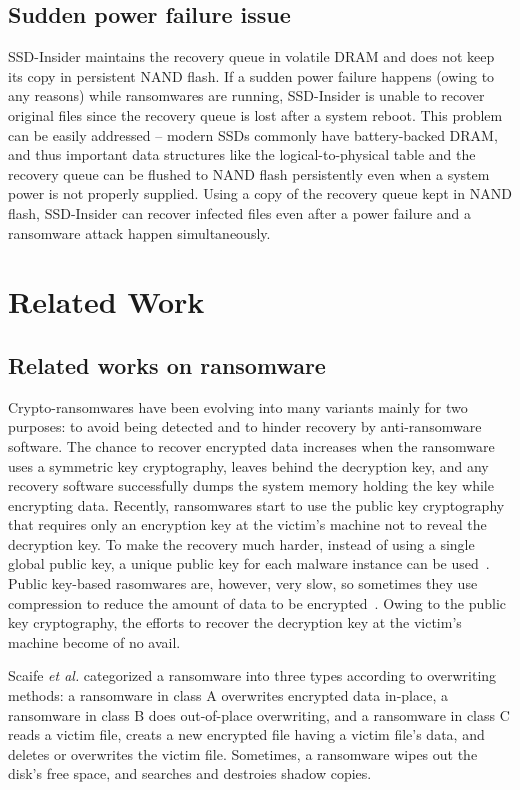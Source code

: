 \documentclass[conference]{IEEEtran}
\newcommand{\etal}{{\it et al.}\xspace}
\newcommand{\ours}{SSD-Insider}
\begin{document}
\subsection{Sudden power failure issue}
\ours{} maintains the recovery queue in volatile DRAM and does
not keep its copy in persistent NAND flash. If a sudden power
failure happens (owing to any reasons) while ransomwares are
running, \ours{} is unable to recover original files since the
recovery queue is lost after a system reboot.  This problem can be
easily addressed -- modern SSDs commonly have battery-backed DRAM,
and thus important data structures like the logical-to-physical
table and the recovery queue can be flushed to NAND flash
persistently even when a system power is not properly supplied.
Using a copy of the recovery queue kept in NAND flash, \ours{}
can recover infected files even after a power failure and a
ransomware attack happen simultaneously.



\section{Related Work}

\subsection{Related works on ransomware}\label{sec:rel-ran}

Crypto-ransomwares have been evolving into many variants mainly for two purposes: 
to avoid being detected and to hinder recovery by anti-ransomware software. 
The chance to recover encrypted data increases
when the ransomware uses a symmetric key cryptography, leaves behind the decryption key, 
and any recovery software successfully dumps the system memory holding the key 
while encrypting data. Recently, ransomwares start to use the public key cryptography 
that requires only an encryption key at the victim's machine not to reveal the decryption key.
To make the recovery much harder, instead of using a single global public key,
a unique public key for each malware instance can be used~\cite{orman16}. 
Public key-based rasomwares are, however, very slow, so sometimes they use compression 
to reduce the amount of data to be encrypted~\cite{maktub}.
Owing to the public key cryptography, 
the efforts to recover the decryption key at the victim's machine become of no avail.

Scaife \etal categorized a ransomware into three types according to 
overwriting methods: a ransomware in class A overwrites encrypted data in-place, 
a ransomware in class B does out-of-place overwriting, and a ransomware in 
class C reads a victim file, creats a new encrypted file having a victim file's data, 
and deletes or overwrites the victim file.
Sometimes, a ransomware wipes out the disk's free space, 
and searches and destroies shadow copies.
\end{document}
